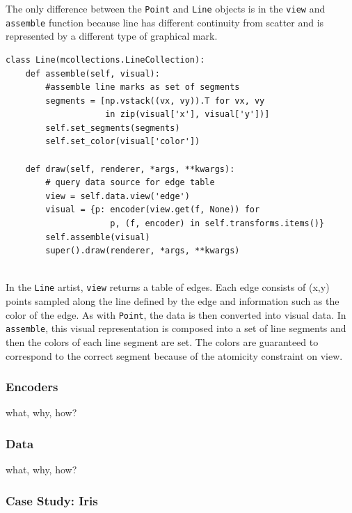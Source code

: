 \documentclass[../main.tex]{subfiles}
\begin{document}
The only difference between the \texttt{Point} and \texttt{Line} objects is in the \texttt{view} and \texttt{assemble} function because line has different continuity from scatter and is represented by a different type of graphical mark. 

\begin{verbatim}
class Line(mcollections.LineCollection):
    def assemble(self, visual):
        #assemble line marks as set of segments 
        segments = [np.vstack((vx, vy)).T for vx, vy 
                    in zip(visual['x'], visual['y'])]
        self.set_segments(segments)
        self.set_color(visual['color'])
        
    def draw(self, renderer, *args, **kwargs):
        # query data source for edge table
        view = self.data.view('edge')
        visual = {p: encoder(view.get(f, None)) for 
                     p, (f, encoder) in self.transforms.items()}
        self.assemble(visual)
        super().draw(renderer, *args, **kwargs)


\end{verbatim}
In the \texttt{Line} artist, \texttt{view} returns a table of edges. Each edge consists of (x,y) points sampled along the line defined by the edge and information such as the color of the edge. As with \texttt{Point}, the data is then converted into visual data. In \texttt{assemble}, this visual representation is composed into a set of line segments and then the colors of each line segment are set. The colors are guaranteed to correspond to the correct segment because of the atomicity constraint on view. 

\subsubsection{Encoders \vchannel}
what, why, how?
\subsubsection{Data \dtotal}
what, why, how?

\subsubsection{Case Study: Iris}
\end{document}
